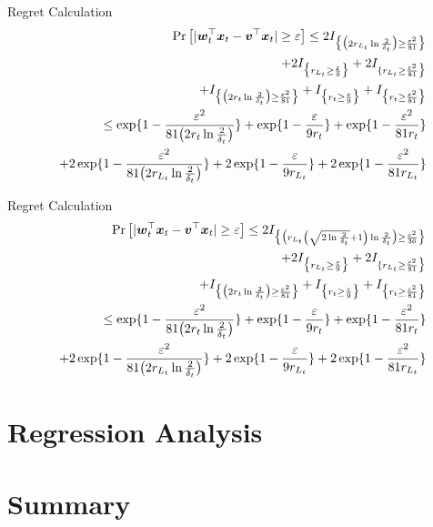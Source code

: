 \documentclass{beamer}
\begin{document}
\begin{frame}{Regret Calculation}
\begin{eqnarray}
&&{\rm Pr}\left[{|{{\boldsymbol{w}}}^{\top}_{t}{\boldsymbol{x}}_{t}-{{\boldsymbol{v}}}^{\top}{\boldsymbol{x}}_{t}|\geq\varepsilon}\right]\leq 2I_{\big\{\big(2r_{L_t}\ln{\frac{2}{\delta_t}}\big)\geq\frac{\varepsilon^2}{81}\big\}}\\
&&+2I_{\big\{r_{L_t}\geq\frac{\varepsilon}{9}\big\}}+2I_{\{r_{L_t}\geq\frac{\varepsilon^2}{81}\big\}}\nonumber\\
&&+I_{\big\{\big(2r_t\ln{\frac{2}{\delta_t}}\big)\geq\frac{\varepsilon^2}{81}\big\}}+I_{\big\{r_t\geq\frac{\varepsilon}{9}\big\}}+I_{\big\{r_t\geq\frac{\varepsilon^2}{81}\big\}}\nonumber\\
&&\leq\exp\{1-\frac{\varepsilon^2}{81\big(2r_t\ln{\frac{2}{\delta_t}}\big)}\}+\exp\{1-\frac{\varepsilon}{9r_t}\}+\exp\{1-\frac{\varepsilon^2}{81r_t}\}\nonumber\\
&&+2\exp\{1-\frac{\varepsilon^2}{81\big(2r_{L_t}\ln{\frac{2}{\delta_t}}\big)}\}+2\exp\{1-\frac{\varepsilon}{9r_{L_t}}\}+2\exp\{1-\frac{\varepsilon^2}{81r_{L_t}}\}\nonumber
\label{exponent_regret_class}
\end{eqnarray}
\end{frame}


\begin{frame}{Regret Calculation}
\begin{eqnarray}
&&{\rm Pr}\left[{|{{\boldsymbol{w}}}^{\top}_{t}{\boldsymbol{x}}_{t}-{{\boldsymbol{v}}}^{\top}{\boldsymbol{x}}_{t}|\geq\varepsilon}\right]\leq 2I_{\big\{\big(r_{L_t}\left(\sqrt{2\ln{\frac{2}{\delta_t}}}+1\right)\ln{\frac{2}{\delta_t}}\big)\geq\frac{\varepsilon^2}{36}\big\}}\\
&&+2I_{\big\{r_{L_t}\geq\frac{\varepsilon}{9}\big\}}+2I_{\{r_{L_t}\geq\frac{\varepsilon^2}{81}\big\}}\nonumber\\
&&+I_{\big\{\big(2r_t\ln{\frac{2}{\delta_t}}\big)\geq\frac{\varepsilon^2}{81}\big\}}+I_{\big\{r_t\geq\frac{\varepsilon}{9}\big\}}+I_{\big\{r_t\geq\frac{\varepsilon^2}{81}\big\}}\nonumber\\
&&\leq\exp\{1-\frac{\varepsilon^2}{81\big(2r_t\ln{\frac{2}{\delta_t}}\big)}\}+\exp\{1-\frac{\varepsilon}{9r_t}\}+\exp\{1-\frac{\varepsilon^2}{81r_t}\}\nonumber\\
&&+2\exp\{1-\frac{\varepsilon^2}{81\big(2r_{L_t}\ln{\frac{2}{\delta_t}}\big)}\}+2\exp\{1-\frac{\varepsilon}{9r_{L_t}}\}+2\exp\{1-\frac{\varepsilon^2}{81r_{L_t}}\}\nonumber
\label{exponent_regret_class}
\end{eqnarray}
\end{frame}
























\section{Regression Analysis}

\section{Summary}
\end{document}
